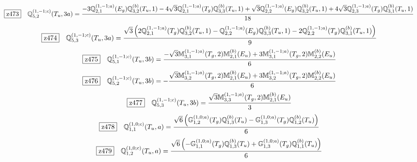 \documentclass[fleqn,10pt,landscape]{jsarticle}
\begin{document}
\begin{dmath*}
\hspace*{3mm}\fbox{z473}\quad \mathbb{Q}_{5,2}^{(1,-1;c)}(T_{u},3a)=\frac{- 3 \mathbb{Q}_{2,1}^{(1,-1;a)}(E_{g}) \mathbb{Q}_{3,2}^{(b)}(T_{u},1) - 4 \sqrt{3} \mathbb{Q}_{2,1}^{(1,-1;a)}(T_{g}) \mathbb{Q}_{3,3}^{(b)}(T_{u},1) + \sqrt{3} \mathbb{Q}_{2,2}^{(1,-1;a)}(E_{g}) \mathbb{Q}_{3,2}^{(b)}(T_{u},1) + 4 \sqrt{3} \mathbb{Q}_{2,3}^{(1,-1;a)}(T_{g}) \mathbb{Q}_{3,1}^{(b)}(T_{u},1)}{18}
\end{dmath*}
\begin{dmath*}
\hspace*{3mm}\fbox{z474}\quad \mathbb{Q}_{5,3}^{(1,-1;c)}(T_{u},3a)=\frac{\sqrt{3} \left(2 \mathbb{Q}_{2,1}^{(1,-1;a)}(T_{g}) \mathbb{Q}_{3,2}^{(b)}(T_{u},1) - \mathbb{Q}_{2,2}^{(1,-1;a)}(E_{g}) \mathbb{Q}_{3,3}^{(b)}(T_{u},1) - 2 \mathbb{Q}_{2,2}^{(1,-1;a)}(T_{g}) \mathbb{Q}_{3,1}^{(b)}(T_{u},1)\right)}{9}
\end{dmath*}
\begin{dmath*}
\hspace*{3mm}\fbox{z475}\quad \mathbb{Q}_{5,1}^{(1,-1;c)}(T_{u},3b)=\frac{- \sqrt{3} \mathbb{M}_{3,1}^{(1,-1;a)}(T_{g},2) \mathbb{M}_{2,1}^{(b)}(E_{u}) + 3 \mathbb{M}_{3,1}^{(1,-1;a)}(T_{g},2) \mathbb{M}_{2,2}^{(b)}(E_{u})}{6}
\end{dmath*}
\begin{dmath*}
\hspace*{3mm}\fbox{z476}\quad \mathbb{Q}_{5,2}^{(1,-1;c)}(T_{u},3b)=- \frac{\sqrt{3} \mathbb{M}_{3,2}^{(1,-1;a)}(T_{g},2) \mathbb{M}_{2,1}^{(b)}(E_{u}) + 3 \mathbb{M}_{3,2}^{(1,-1;a)}(T_{g},2) \mathbb{M}_{2,2}^{(b)}(E_{u})}{6}
\end{dmath*}
\begin{dmath*}
\hspace*{3mm}\fbox{z477}\quad \mathbb{Q}_{5,3}^{(1,-1;c)}(T_{u},3b)=\frac{\sqrt{3} \mathbb{M}_{3,3}^{(1,-1;a)}(T_{g},2) \mathbb{M}_{2,1}^{(b)}(E_{u})}{3}
\end{dmath*}
\begin{dmath*}
\hspace*{3mm}\fbox{z478}\quad \mathbb{Q}_{1,1}^{(1,0;c)}(T_{u},a)=\frac{\sqrt{6} \left(\mathbb{G}_{1,2}^{(1,0;a)}(T_{g}) \mathbb{Q}_{1,3}^{(b)}(T_{u}) - \mathbb{G}_{1,3}^{(1,0;a)}(T_{g}) \mathbb{Q}_{1,2}^{(b)}(T_{u})\right)}{6}
\end{dmath*}
\begin{dmath*}
\hspace*{3mm}\fbox{z479}\quad \mathbb{Q}_{1,2}^{(1,0;c)}(T_{u},a)=\frac{\sqrt{6} \left(- \mathbb{G}_{1,1}^{(1,0;a)}(T_{g}) \mathbb{Q}_{1,3}^{(b)}(T_{u}) + \mathbb{G}_{1,3}^{(1,0;a)}(T_{g}) \mathbb{Q}_{1,1}^{(b)}(T_{u})\right)}{6}
\end{dmath*}
\end{document}

